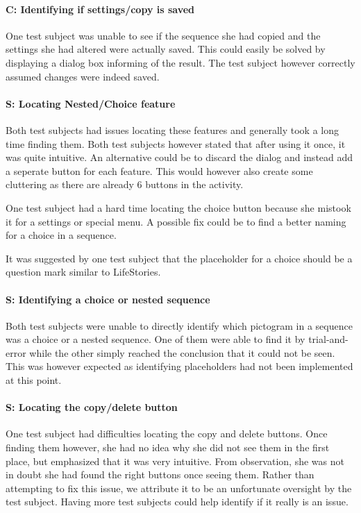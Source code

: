 \paragraph{C: Identifying if settings/copy is saved}
One test subject was unable to see if the sequence she had copied and the settings she had altered were actually saved. This could easily be solved by displaying a dialog box informing of the result. The test subject however correctly assumed changes were indeed saved.

\paragraph{S: Locating Nested/Choice feature}
Both test subjects had issues locating these features and generally took a long time finding them. Both test subjects however stated that after using it once, it was quite intuitive. An alternative could be to discard the dialog and instead add a seperate button for each feature. This would however also create some cluttering as there are already 6 buttons in the activity.

One test subject had a hard time locating the choice button because she mistook it for a settings or special menu. A possible fix could be to find a better naming for a choice in a sequence.

It was suggested by one test subject that the placeholder for a choice should be a question mark similar to LifeStories.

\paragraph{S: Identifying a choice or nested sequence}
Both test subjects were unable to directly identify which pictogram in a sequence was a choice or a nested sequence. One of them were able to find it by trial-and-error while the other simply reached the conclusion that it could not be seen. This was however expected as identifying placeholders had not been implemented at this point.

\paragraph{S: Locating the copy/delete button}
One test subject had difficulties locating the copy and delete buttons. Once finding them however, she had no idea why she did not see them in the first place, but emphasized that it was very intuitive. From observation, she was not in doubt she had found the right buttons once seeing them. Rather than attempting to fix this issue, we attribute it to be an unfortunate oversight by the test subject. Having more test subjects could help identify if it really is an issue.